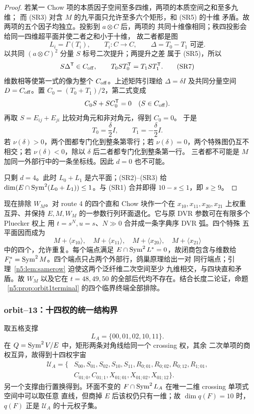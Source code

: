\begin{proof}
若某一 Chow 项的本质因子空间至多四维，两项的本质空间之和至多九维；
而 (SR3) 对含 \(M\) 的九平面只允许至多六个矩形，和 (SR5) 的十维
矛盾。故两项的五个因子均独立。投影到 \(a\otimes C\) 后，两项的
共同十维像相同；秩四投影会给同一四维超平面并使二者之和小于十维，
故二者都是图
\[
 L_i=\Gamma(T_i),\qquad T_i:C\to C,\qquad
 \Delta=T_0-T_1\text{ 可逆}.                            \tag{SR6}
\]
以共同 \((a\otimes C)^2\) 分量 \(S\) 标号二次提升；两提升之差
属于 (SR5)，所以
\[
 S\Delta^{\mathsf T}\in C_{\rm off},\qquad
 T_0ST_0^{\mathsf T}=T_1ST_1^{\mathsf T}.              \tag{SR7}
\]
维数相等使第一式的像为整个 \(C_{\rm off}\)。上述矩阵引理给
\(\Delta=\delta I\) 及共同分量空间 \(D=C_{\rm off}\)。置
\(C_0=(T_0+T_1)/2\)，第二式变成
\[
 C_0S+SC_0^{\mathsf T}=0\quad(S\in C_{\rm off}).
\]
再取 \(S=E_{ij}+E_{ji}\) 比较对角元和非对角元，得到 \(C_0=0\)。
于是
\[
 T_0=\frac\delta2I,\qquad T_1=-\frac\delta2I.           \tag{SR8}
\]
若 \(\nu(\delta)>0\)，两个图都专门化到整条第零行；若
\(\nu(\delta)=0\)，两个特殊图仍互不相交；若
\(\nu(\delta)<0\)，除以 \(\delta\) 后二者都专门化到整条第一行。
三者都不可能是 \(M\) 加同一外部行中的一条坐标线。因此 \(d=0\)
也不可能。

只剩 \(d=4\)。此时 \(L_0+L_1\) 是六平面；(SR2)--(SR3) 给
\(\dim(E\cap\operatorname{Sym}^2(L_0+L_1))\le1\)。与 (SR1) 合并即得
\(10-s\le1\)，即 \(s\ge9\)。
\end{proof}

现在排除 \(W_M\)。对 route 4 的四个直和 Chow 块作一个在
\(x_{10},x_{11},x_{20},x_{21}\) 上权重互异、并保持 \(E,M,W_M\)
的一参数行列环面退化。它与原 DVR 参数可在有限多个 Pluecker 权上
用 \(t=s^N,u=s\)、\(N\gg0\) 合并成一条字典序 DVR 弧。四个特殊
五平面因而成为
\[
 M+\langle x_{10}\rangle,\quad M+\langle x_{11}\rangle,\quad
 M+\langle x_{20}\rangle,\quad M+\langle x_{21}\rangle
\]
中的四个，允许重复。每个端点满足
\(E\cap\operatorname{Sym}^2L^*=0\)，故闭商包含与维数给
\(F_i^*=\operatorname{Sym}^2M\)。四个端点只占两个外部行，鸽巢原理给出一对
同行端点；引理~\ref{n5:lem:samerow} 迫使这两个泛纤维二次空间至少
九维相交，与四块直和矛盾。故 \(W_M\) 以及它在
\(t=48,49,50\) 的全部后代均不存在。结合长度二论证，命题
~\ref{n5:prop:orbit1terminal} 的四个临界终端全部排除。

\subsubsection{orbit--13：十四权的统一结构界}

取五格支撑
\[
 L_A=\{00,01,02,10,11\}.
\]
在 \(Q=\operatorname{Sym}^2V/E\) 中，矩形两条对角线给同一个 crossing 权，其余
二次单项的商权互异，故得到十四权宇宙
\[
\begin{aligned}
\mathcal U_A=\{&S_{00},S_{01},S_{02},S_{10},S_{11},
R_{0;01},R_{0;02},R_{0;12},R_{1;01},\\
&C_{01;0},C_{01;1},X_{01;01},X_{01;02},X_{01;12}\}.
\end{aligned}
\]
另一个支撑由行置换得到。环面不变的
\(F\cap\operatorname{Sym}^2L_A\) 在唯一二维 crossing 单项式空间中可以取任意
直线，但商掉 \(E\) 后该权仍只有一维；故 \(\dim q(F)=10\) 时，
\(q(F)\) 正是 \(\mathcal U_A\) 的十元权子集。

